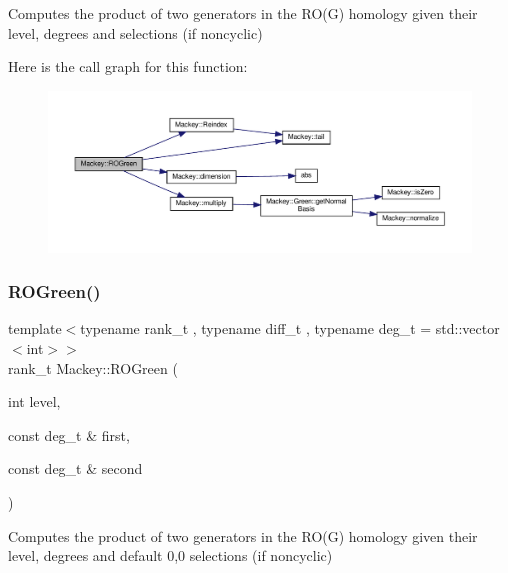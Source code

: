 Computes the product of two generators in the R\+O(\+G) homology given their level, degrees and selections (if noncyclic) 

Here is the call graph for this function\+:\nopagebreak
\begin{figure}[H]
\begin{center}
\leavevmode
\includegraphics[width=350pt]{namespaceMackey_a2bd86833844ca62d76c47a54aeb0bb77_cgraph}
\end{center}
\end{figure}
\mbox{\label{namespaceMackey_a07d3b1e748c6cf2fd8a6e21b948a0afe}} 
\subsubsection{\texorpdfstring{R\+O\+Green()}{ROGreen()}\hspace{0.1cm}{\footnotesize\ttfamily [2/2]}}
{\footnotesize\ttfamily template$<$typename rank\+\_\+t , typename diff\+\_\+t , typename deg\+\_\+t  = std\+::vector$<$int$>$$>$ \\
rank\+\_\+t Mackey\+::\+R\+O\+Green (\begin{DoxyParamCaption}\item[{int}]{level,  }\item[{const deg\+\_\+t \&}]{first,  }\item[{const deg\+\_\+t \&}]{second }\end{DoxyParamCaption})\hspace{0.3cm}{\ttfamily [inline]}}



Computes the product of two generators in the R\+O(\+G) homology given their level, degrees and default 0,0 selections (if noncyclic) 

\mbox{\label{namespaceMackey_aa014e2177bd124bce2e8e7a4c1dc8d38}} 
